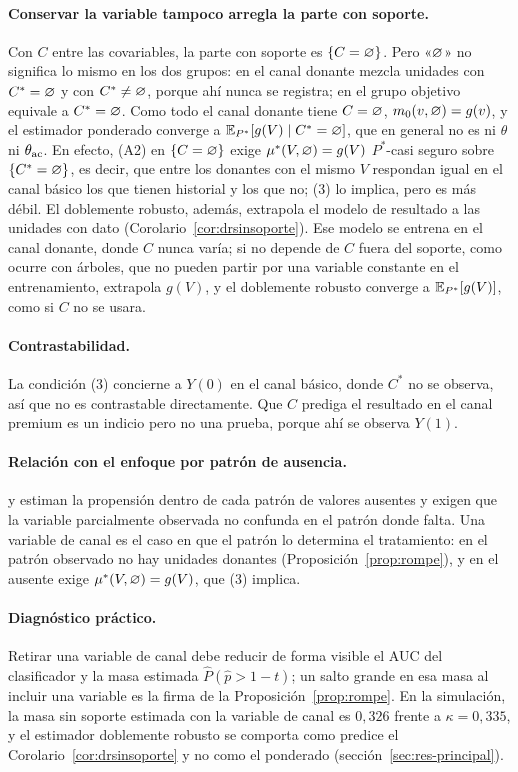 \paragraph{Conservar la variable tampoco arregla la parte con soporte.} Con $C$ entre las covariables, la parte con soporte es $\{C=\varnothing\}$. Pero «$\varnothing$» no significa lo mismo en los dos grupos: en el canal donante mezcla unidades con $C^*=\varnothing$ y con $C^*\ne\varnothing$, porque ahí nunca se registra; en el grupo objetivo equivale a $C^*=\varnothing$. Como todo el canal donante tiene $C=\varnothing$, $m_0(v,\varnothing)=g(v)$, y el estimador ponderado converge a $\mathbb{E}_{P^*}[g(V)\mid C^*=\varnothing]$, que en general no es ni $\theta$ ni $\theta_{\mathrm{ac}}$. En efecto, (A2) en $\{C=\varnothing\}$ exige $\mu^*(V,\varnothing)=g(V)$ $P^*$-casi seguro sobre $\{C^*=\varnothing\}$, es decir, que entre los donantes con el mismo $V$ respondan igual en el canal básico los que tienen historial y los que no; (3) lo implica, pero es más débil. El doblemente robusto, además, extrapola el modelo de resultado a las unidades con dato (Corolario~\ref{cor:drsinsoporte}). Ese modelo se entrena en el canal donante, donde $C$ nunca varía; si no depende de $C$ fuera del soporte, como ocurre con árboles, que no pueden partir por una variable constante en el entrenamiento, extrapola $g(V)$, y el doblemente robusto converge a $\mathbb{E}_{P^*}[g(V)]$, como si $C$ no se usara.

\paragraph{Contrastabilidad.} La condición (3) concierne a $Y(0)$ en el canal básico, donde $C^*$ no se observa, así que no es contrastable directamente. Que $C$ prediga el resultado en el canal premium es un indicio pero no una prueba, porque ahí se observa $Y(1)$.

\paragraph{Relación con el enfoque por patrón de ausencia.} \citet{dagostino2000} y \citet{blake2020} estiman la propensión dentro de cada patrón de valores ausentes y exigen que la variable parcialmente observada no confunda en el patrón donde falta. Una variable de canal es el caso en que el patrón lo determina el tratamiento: en el patrón observado no hay unidades donantes (Proposición~\ref{prop:rompe}), y en el ausente exige $\mu^*(V,\varnothing)=g(V)$, que (3) implica.

\paragraph{Diagnóstico práctico.} Retirar una variable de canal debe reducir de forma visible el AUC del clasificador y la masa estimada $\hat P(\hat p>1-t)$; un salto grande en esa masa al incluir una variable es la firma de la Proposición~\ref{prop:rompe}. En la simulación, la masa sin soporte estimada con la variable de canal es $0,326$ frente a $\kappa=0,335$, y el estimador doblemente robusto se comporta como predice el Corolario~\ref{cor:drsinsoporte} y no como el ponderado (sección~\ref{sec:res-principal}).


